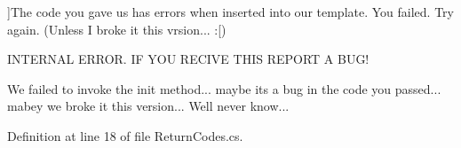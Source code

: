 \begin{Desc}
\begin{description}
{}]The code you gave us has errors when inserted into our template. You failed. Try again. (Unless I broke it this vrsion... \+:\mbox{[}) \item[{\em 
No\+Type\+For\+Event\hypertarget{namespace_function_jumper_a24f4a41f38d23a485ba532d6171b2048_a24f4a41f38d23a485ba532d6171b2048a412e9b8a1ab543e3e8c8ec507cbee5ee}{}\label{namespace_function_jumper_a24f4a41f38d23a485ba532d6171b2048_a24f4a41f38d23a485ba532d6171b2048a412e9b8a1ab543e3e8c8ec507cbee5ee}
}]I\+N\+T\+E\+R\+N\+AL E\+R\+R\+OR. IF Y\+OU R\+E\+C\+I\+VE T\+H\+IS R\+E\+P\+O\+RT A B\+U\+G! \item[{\em 
Init\+Failed\hypertarget{namespace_function_jumper_a24f4a41f38d23a485ba532d6171b2048_a24f4a41f38d23a485ba532d6171b2048a6bea6035f6c13c665971ef550e9ba722}{}\label{namespace_function_jumper_a24f4a41f38d23a485ba532d6171b2048_a24f4a41f38d23a485ba532d6171b2048a6bea6035f6c13c665971ef550e9ba722}
}]We failed to invoke the init method... maybe its a bug in the code you passed... mabey we broke it this version... We\textquotesingle{}ll never know... \end{description}
\end{Desc}


Definition at line 18 of file Return\+Codes.\+cs.


